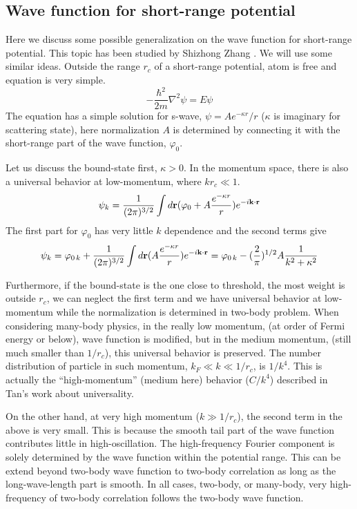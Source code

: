 \begin{subappendices}
\section{Wave function for short-range potential}\label{sec:pathInt2:short-range}
Here we discuss some possible generalization on the wave function for short-range potential.  This topic has been studied by Shizhong Zhang \cite{shizhongUniv}. We will use some similar ideas.  Outside the range $r_{c}$ of a short-range potential,  atom is free and  \sch equation is very simple.
\begin{equation}
-\frac{\hbar^{2}}{2m}\nabla^{2}\psi=E\psi
\end{equation}
The equation has a simple solution for s-wave, $\psi=A{e^{-\kappa{r}}}/{r}$ ($\kappa$ is imaginary for scattering state), here normalization $A$ is determined  by connecting it with the short-range part of the wave function, $\varphi_0$. 

Let us discuss the bound-state first, $\kappa>0$.  In the momentum space, there is also a universal behavior at low-momentum, where $kr_{c}\ll1$.   
\begin{equation*}
\psi_{k}=\frac{1}{(2\pi)^{3/2}}\int{d\ensuremath{\mathbf{r}}}(\varphi_{0}+A\frac{e^{-\kappa{r}}}{r})e^{-i\mathbf{k}\cdot\mathbf{r}}
\end{equation*}
The first part for $\varphi_{0}$ has very little $k$ dependence and the second terms give
\begin{equation*}
\psi_{k}=\varphi_{0\,k}+\frac{1}{(2\pi)^{3/2}}\int{d\ensuremath{\mathbf{r}}}(A\frac{e^{-\kappa{r}}}{r})e^{-i\mathbf{k}\cdot\mathbf{r}}=\varphi_{0\,k}-(\frac{2}{\pi})^{1/2}A\frac{1}{k^{2}+\kappa^{2}}
\end{equation*}

Furthermore, if the bound-state is the one close to threshold, the most weight is outside $r_{c}$, we can neglect the first term and we have universal behavior at low-momentum while the normalization is determined in two-body problem.   When considering many-body physics, in the really low momentum, (at order of Fermi energy or below), wave function  is modified, but in the medium momentum, (still much smaller than $1/r_{c}$), this universal behavior is preserved.  The number distribution of particle in such momentum, $k_{F}\ll{k}\ll{1/r_{c}}$, is $1/k^{4}$. This is actually the ``high-momentum'' (medium here) behavior ($C/k^{4}$) described in Tan's work about universality\cite{Tan2008-1,Tan2008-2}. 

On the other hand, at very high momentum ($k\gg1/r_{c}$), the second term in the above is very small.  This is because the smooth tail part of the wave function contributes little in high-oscillation.  The high-frequency Fourier component is solely determined by the wave function within the potential range.   This can be extend beyond two-body wave function to two-body correlation as long as the long-wave-length part is smooth.  In all cases, two-body, or many-body, very high-frequency of two-body correlation follows the two-body wave function.  

\end{subappendices}

